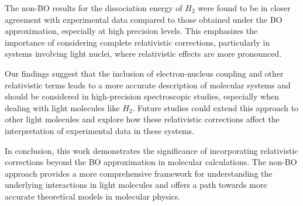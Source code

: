 \documentclass[%
 reprint,
 amsmath,amssymb,
 aps,
]{revtex4-2}
\begin{document}
The non-BO results for the dissociation energy of \(H_2\) were found to be in closer agreement with experimental data compared to those obtained under the BO approximation, especially at high precision levels. This emphasizes the importance of considering complete relativistic corrections, particularly in systems involving light nuclei, where relativistic effects are more pronounced.

Our findings suggest that the inclusion of electron-nucleus coupling and other relativistic terms leads to a more accurate description of molecular systems and should be considered in high-precision spectroscopic studies, especially when dealing with light molecules like \(H_2\). Future studies could extend this approach to other light molecules and explore how these relativistic corrections affect the interpretation of experimental data in these systems.

In conclusion, this work demonstrates the significance of incorporating relativistic corrections beyond the BO approximation in molecular calculations. The non-BO approach provides a more comprehensive framework for understanding the underlying interactions in light molecules and offers a path towards more accurate theoretical models in molecular physics.











\end{document}
